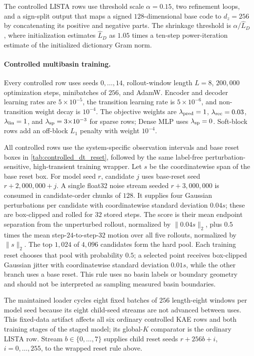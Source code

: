 The controlled LISTA rows use threshold scale \(\alpha=0.15\), two refinement loops, and a sign-split output that maps a signed \(128\)-dimensional base code to \(d_z=256\) by concatenating its positive and negative parts. The shrinkage threshold is \(\alpha/\widehat L_D\), where initialization estimates \(\widehat L_D\) as \(1.05\) times a ten-step power-iteration estimate of the initialized dictionary Gram norm.

\paragraph{Controlled multibasin training.}
Every controlled row uses seeds \(0,\ldots,14\), rollout-window length \(L=8\), \(200{,}000\) optimization steps, minibatches of \(256\), and AdamW. Encoder and decoder learning rates are \(5{\times}10^{-5}\), the transition learning rate is \(5{\times}10^{-6}\), and non-transition weight decay is \(10^{-4}\). The objective weights are \(\lambda_{\rm pred}=1\), \(\lambda_{\rm rec}=0.03\), \(\lambda_{\rm lin}=1\), and \(\lambda_{\rm sp}=3{\times}10^{-3}\) for sparse rows; Dense MLP uses \(\lambda_{\rm sp}=0\). Soft-block rows add an off-block \(L_1\) penalty with weight \(10^{-4}\).

All controlled rows use the system-specific observation intervals and base reset boxes in \cref{tab:controlled_dt_reset}, followed by the same label-free perturbation-sensitive, high-transient training wrapper. Let \(s\) be the coordinatewise span of the base reset box. For model seed \(r\), candidate \(j\) uses base-reset seed \(r+2{,}000{,}000+j\). A single float32 noise stream seeded \(r+3{,}000{,}000\) is consumed in candidate-order chunks of \(128\). It supplies four Gaussian perturbations per candidate with coordinatewise standard deviation \(0.04s\); these are box-clipped and rolled for \(32\) stored steps. The score is their mean endpoint separation from the unperturbed rollout, normalized by \(\lVert0.04s\rVert_2\), plus \(0.5\) times the mean step-\(24\)-to-step-\(32\) motion over all five rollouts, normalized by \(\lVert s\rVert_2\). The top \(1{,}024\) of \(4{,}096\) candidates form the hard pool. Each training reset chooses that pool with probability \(0.5\); a selected point receives box-clipped Gaussian jitter with coordinatewise standard deviation \(0.01s\), while the other branch uses a base reset. This rule uses no basin labels or boundary geometry and should not be interpreted as sampling measured basin boundaries.

The maintained loader cycles eight fixed batches of \(256\) length-eight windows per model seed because its eight child-seed streams are not advanced between uses. This fixed-data artifact affects all six ordinary controlled KAE rows and both training stages of the staged model; its global-\(K\) comparator is the ordinary LISTA row. Stream \(b\in\{0,\ldots,7\}\) supplies child reset seeds \(r+256b+i\), \(i=0,\ldots,255\), to the wrapped reset rule above.

